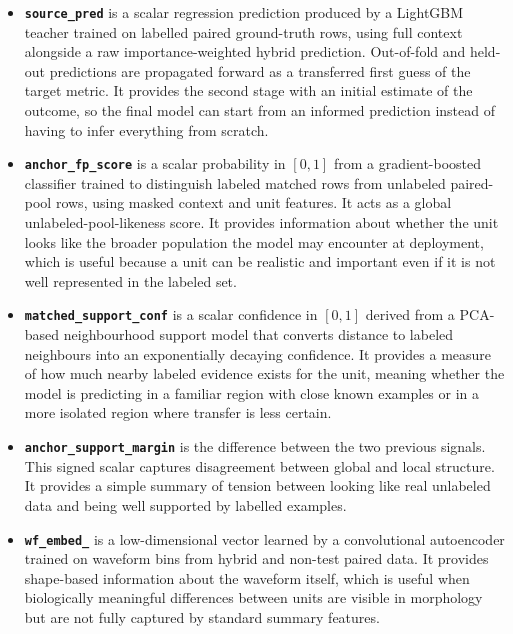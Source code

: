 \begin{itemize}
    \item \textbf{\texttt{source\_pred}} is a scalar regression prediction produced by a LightGBM \parencite{Ke2017} teacher trained on labelled paired ground-truth rows, using full context alongside a raw importance-weighted hybrid prediction. Out-of-fold and held-out predictions are propagated forward as a transferred first guess of the target metric. It provides the second stage with an initial estimate of the outcome, so the final model can start from an informed prediction instead of having to infer everything from scratch.
    \item \textbf{\texttt{anchor\_fp\_score}} is a scalar probability in $[0,1]$ from a gradient-boosted classifier trained to distinguish labeled matched rows from unlabeled paired-pool rows, using masked context and unit features. It acts as a global unlabeled-pool-likeness score. It provides information about whether the unit looks like the broader population the model may encounter at deployment, which is useful because a unit can be realistic and important even if it is not well represented in the labeled set.
    \item \textbf{\texttt{matched\_support\_conf}} is a scalar confidence in $[0,1]$ derived from a PCA-based neighbourhood support model that converts distance to labeled neighbours into an exponentially decaying confidence. It provides a measure of how much nearby labeled evidence exists for the unit, meaning whether the model is predicting in a familiar region with close known examples or in a more isolated region where transfer is less certain.
    \item \textbf{\texttt{anchor\_support\_margin}} is the difference between the two previous signals. This signed scalar captures disagreement between global and local structure. It provides a simple summary of tension between looking like real unlabeled data and being well supported by labelled examples.
    \item \textbf{\texttt{wf\_embed\_\*}} is a low-dimensional vector learned by a convolutional autoencoder trained on waveform bins from hybrid and non-test paired data. It provides shape-based information about the waveform itself, which is useful when biologically meaningful differences between units are visible in morphology but are not fully captured by standard summary features.
\end{itemize}

